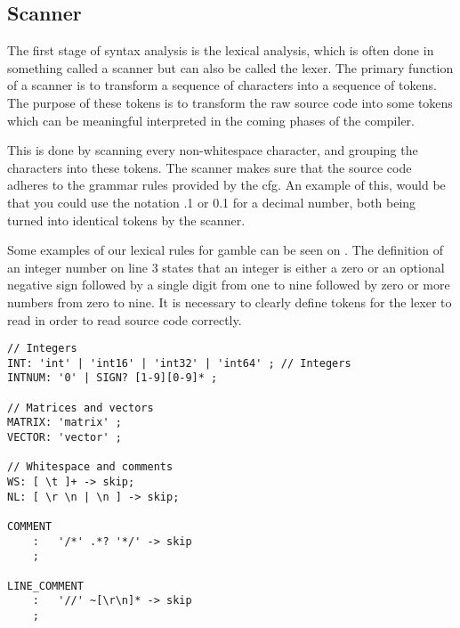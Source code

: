 \subsection*{Scanner}
The first stage of syntax analysis is the lexical analysis, which is often done in something called a scanner but can also be called the lexer.
The primary function of a scanner is to transform a sequence of characters into a sequence of tokens.
The purpose of these tokens is to transform the raw source code into some tokens which can be meaningful interpreted in the coming phases of the compiler.
  
This is done by scanning every non-whitespace character, and grouping the characters into these tokens.
The scanner makes sure that the source code adheres to the grammar rules provided by the \acrshort{cfg}.
An example of this, would be that you could use the notation .1 or 0.1 for a decimal number, both being turned into identical tokens by the scanner.

Some examples of our lexical rules for \gls{gamble} can be seen on .
The definition of an integer number on line 3 states that an integer is either a zero or an optional negative sign followed by a single digit from one to nine followed by zero or more numbers from zero to nine.
It is necessary to clearly define tokens for the lexer to read in order to read source code correctly. \citep{Crafting_book}

\begin{lstlisting}[caption=Example of our lexer rules for \gls{gamble},frame=tlrb,label={lst:token}]
// Integers
INT: 'int' | 'int16' | 'int32' | 'int64' ; // Integers
INTNUM: '0' | SIGN? [1-9][0-9]* ;

// Matrices and vectors
MATRIX: 'matrix' ;
VECTOR: 'vector' ;

// Whitespace and comments
WS: [ \t ]+ -> skip;
NL: [ \r \n | \n ] -> skip;

COMMENT
    :   '/*' .*? '*/' -> skip
    ;

LINE_COMMENT
    :   '//' ~[\r\n]* -> skip
    ;
\end{lstlisting} 